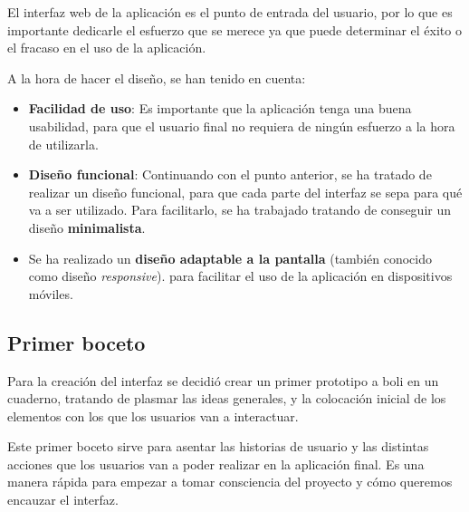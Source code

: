 \documentclass{\ClassPath/viu-tfm-template}
\begin{document}
El interfaz web de la aplicación es el punto de entrada del usuario, por lo que es importante dedicarle el esfuerzo que se merece ya que puede determinar el éxito o el fracaso en el uso de la aplicación.

A la hora de hacer el diseño, se han tenido en cuenta:
\begin{itemize}
    \item \textbf{Facilidad de uso}: Es importante que la aplicación tenga una buena usabilidad, para que el usuario final no requiera de ningún esfuerzo a la hora de utilizarla.
    \item \textbf{Diseño funcional}: Continuando con el punto anterior, se ha tratado de realizar un diseño funcional, para que cada parte del interfaz se sepa para qué va a ser utilizado. Para facilitarlo, se ha trabajado tratando de conseguir un diseño \textbf{minimalista}.
    \item Se ha realizado un \textbf{diseño adaptable a la pantalla} (también conocido como diseño \textit{responsive}). para facilitar el uso de la aplicación en dispositivos móviles.
\end{itemize}


\subsection{Primer boceto}
Para la creación del interfaz se decidió crear un primer prototipo a boli en un cuaderno, tratando de plasmar las ideas generales, y la colocación inicial de los elementos con los que los usuarios van a interactuar.

Este primer boceto sirve para asentar las historias de usuario y las distintas acciones que los usuarios van a poder realizar en la aplicación final. Es una manera rápida para empezar a tomar consciencia del proyecto y cómo queremos encauzar el interfaz.
\end{document}
